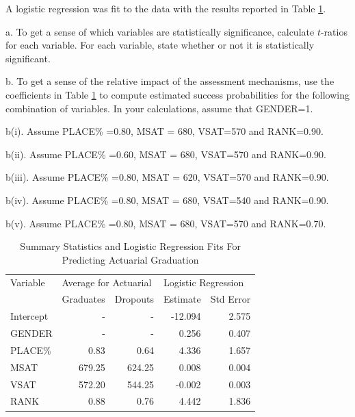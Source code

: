 \begin{exercises}
A logistic regression was fit to the data with the results reported
in Table \ref{T9:ActGrads}.

a. To get a sense of which variables are statistically significance,
calculate $t$-ratios for each variable. For each variable, state
whether or not it is statistically significant.

b. To get a sense of the relative impact of the assessment
mechanisms, use the coefficients in Table \ref{T9:ActGrads} to
compute estimated success probabilities for the following
combination of variables. In your calculations, assume that
GENDER=1.

b(i). Assume PLACE\% =0.80, MSAT = 680, VSAT=570 and RANK=0.90.

b(ii). Assume PLACE\% =0.60, MSAT = 680, VSAT=570 and RANK=0.90.

b(iii). Assume PLACE\% =0.80, MSAT = 620, VSAT=570 and RANK=0.90.

b(iv). Assume PLACE\% =0.80, MSAT = 680, VSAT=540 and RANK=0.90.

b(v). Assume PLACE\% =0.80, MSAT = 680, VSAT=570 and RANK=0.70.



\begin{table}[h]\begin{center}
\caption{\label{T9:ActGrads} Summary Statistics and Logistic
Regression Fits \newline For Predicting Actuarial Graduation}
\begin{tabular}{lrrrr}
  \hline
  Variable & \multicolumn{2}{l}{Average for Actuarial} & \multicolumn{2}{l}{Logistic Regression} \\
& Graduates & Dropouts & Estimate & Std Error \\
  \hline
Intercept & -& - & -12.094 & 2.575 \\
GENDER & - & - & 0.256 & 0.407 \\
  PLACE\% & 0.83 & 0.64 & 4.336 & 1.657 \\
  MSAT & 679.25 & 624.25 & 0.008 & 0.004 \\
  VSAT & 572.20 & 544.25 & -0.002 & 0.003 \\
  RANK & 0.88 & 0.76 & 4.442 & 1.836 \\
  \hline
\end{tabular} \end{center}\end{table}




\end{exercises}
